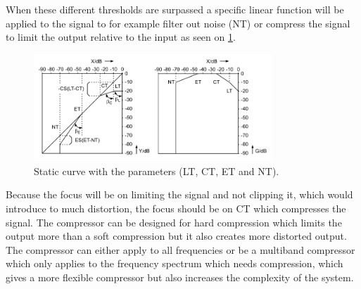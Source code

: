 When these different thresholds are surpassed a specific linear function will be applied to the signal to for example filter out noise (NT) or compress the signal to limit the output relative to the input as seen on \ref{fig:limiter_static}. 

\begin{figure}[H]
\centering
\includegraphics[width=0.8\textwidth]{figures/limiter_static_curve.png}
\caption{Static curve with the parameters (LT, CT, ET and NT).}
\label{fig:limiter_static}
\end{figure}  

Because the focus will be on limiting the signal and not clipping it, which would introduce to much distortion, the focus should be on CT which compresses the signal. The compressor can be designed for hard compression which limits the output more than a soft compression but it also creates more distorted output. The compressor can either apply to all frequencies or be a multiband compressor which only applies to the frequency spectrum which needs compression, which gives a more flexible compressor but also increases the complexity of the system.    

      